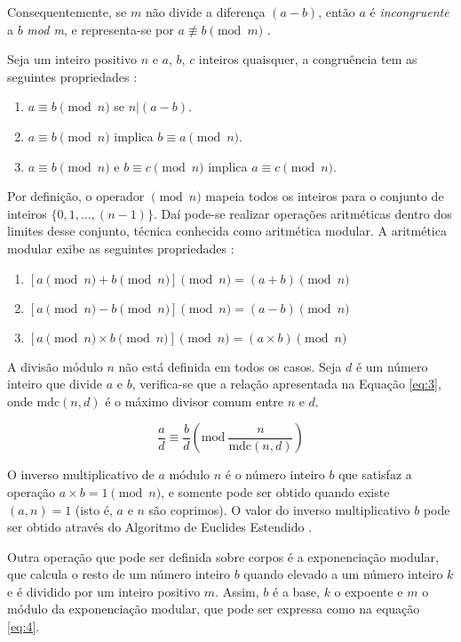 Consequentemente, se \(m\) não divide a diferença $(a - b)$, então \(a\) é \textit{incongruente} a \(b\) \textit{mod m}, e representa-se por $a \not\equiv b \pmod m$ \cite{Santos:2014}.

Seja um inteiro positivo \(n\) e \(a\), \(b\), \(c\) inteiros quaisquer, a congruência tem as seguintes propriedades \cite{Stallings:2011}:
\begin{enumerate}
  \item $a \equiv b \pmod n$ se $n|(a - b)$.
  \item $a \equiv b \pmod n$ implica $b \equiv a \pmod n$.
  \item $a \equiv b \pmod n$ e $b \equiv c \pmod n$ implica $a \equiv c \pmod n$.
\end{enumerate}

Por definição, o operador $\pmod n$ mapeia todos os inteiros para o conjunto de inteiros $\{0, 1, ..., (n-1)\}$. Daí pode-se realizar operações aritméticas dentro dos limites desse conjunto, técnica conhecida como aritmética modular. A aritmética modular exibe as seguintes propriedades \cite{Stallings:2011}:
\begin{enumerate}
  \item $[a \pmod n + b \pmod n] \pmod n = (a + b) \pmod n$
  \item $[a \pmod n - b \pmod n] \pmod n = (a - b) \pmod n$
  \item $[a \pmod n \times b \pmod n] \pmod n = (a \times b) \pmod n$
\end{enumerate}

A divisão módulo $n$ não está definida em todos os casos. Seja \(d\) é um número inteiro que divide \(a\) e \(b\), verifica-se que a relação apresentada na Equação \ref{eq:3}, onde mdc\((n, d)\) é o máximo divisor comum entre \(n\) e \(d\).

\begin{equation}
  \frac{a}{d} \equiv \frac{b}{d}\left(\mbox{mod}\ \frac{n}{\text{mdc}(n,d)}\right) \label{eq:3}
\end{equation}

O inverso multiplicativo de $a$ módulo \(n\) é o número inteiro \(b\) que satisfaz a operação \(a \times b = 1 \pmod  n\), e somente pode ser obtido quando existe \((a, n) = 1\) (isto é, \(a\) e \(n\) são coprimos). O valor do inverso multiplicativo \(b\) pode ser obtido através do Algoritmo de Euclides Estendido \cite{Halim:2013}.

\par Outra operação que pode ser definida sobre corpos é a exponenciação modular, que calcula o resto de um número inteiro \(b\) quando elevado a um número inteiro \(k\) e é dividido por um inteiro positivo \(m\). Assim, $b$ é a base, $k$ o expoente e $m$ o módulo da exponenciação modular, que pode ser expressa como na equação \ref{eq:4}.

